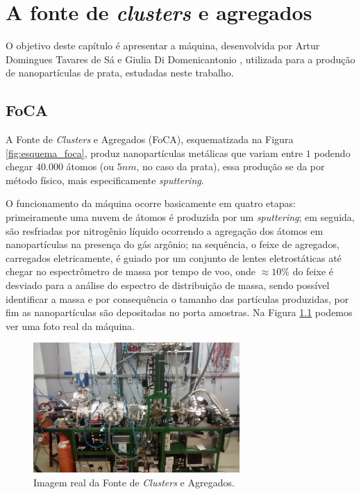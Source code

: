 \chapter{A fonte de \textit{clusters} e agregados}
\label{c3}

O objetivo deste capítulo é apresentar a máquina, desenvolvida por Artur Domingues Tavares de Sá e Giulia Di Domenicantonio \cite{tese_artur}, utilizada para a produção de nanopartículas de prata, estudadas neste trabalho.

\section{FoCA}

A Fonte de \textit{Clusters} e Agregados (FoCA), esquematizada na Figura \ref{fig:esquema_foca}, produz nanopartículas metálicas que variam entre $1$ podendo chegar $40.000$ átomos (ou $5nm$, no caso da prata), essa produção se da por método físico, mais especificamente \textit{sputtering}.

O funcionamento da máquina ocorre basicamente em quatro etapas: primeiramente uma nuvem de átomos é produzida por um \textit{sputtering}; em seguida, são resfriadas por nitrogênio líquido ocorrendo a agregação dos átomos em nanopartículas na presença do gás argônio; na sequência, o feixe de agregados, carregados eletricamente, é guiado por um conjunto de lentes eletrostáticas até chegar no espectrômetro de massa por tempo de voo, onde $\approx10\%$ do feixe é desviado para a análise do espectro de distribuição de massa, sendo possível identificar a massa e por consequência o tamanho das partículas produzidas, por fim as nanopartículas são depositadas no porta amostras. Na Figura \ref{fig:foto_foca} podemos ver uma foto real da máquina. 

\begin{figure}
  \centering
  \includegraphics[width=0.7\textwidth]{images/foca/foto_foca}
  \caption{ Imagem real da  Fonte de \textit{Clusters} e Agregados.  }
  \label{fig:foto_foca}
\end{figure}


